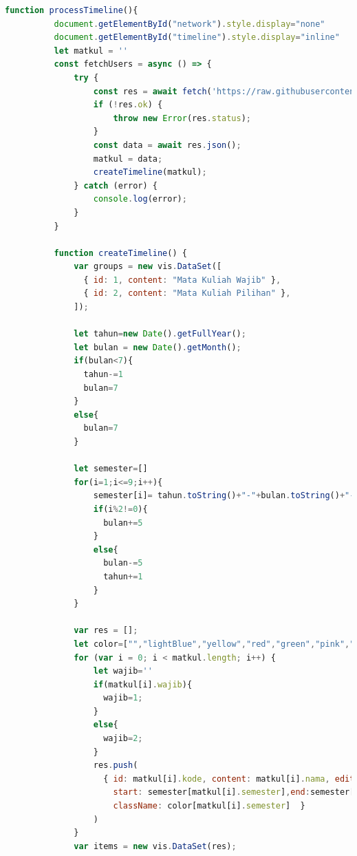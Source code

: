 \begin{itemize}
\begin{itemize}
        \begin{lstlisting}[language=JavaScript, caption=Kode \textit{timeline.js}\label{lst:kodeTimelineJs}]
        function processTimeline(){
          document.getElementById("network").style.display="none"
          document.getElementById("timeline").style.display="inline"
          let matkul = ''
          const fetchUsers = async () => {
              try {
                  const res = await fetch('https://raw.githubusercontent.com/ftisunpar/data/master/prasyarat.json');
                  if (!res.ok) {
                      throw new Error(res.status);
                  }
                  const data = await res.json();
                  matkul = data;
                  createTimeline(matkul);
              } catch (error) {
                  console.log(error);
              }
          }
          
          function createTimeline() {
              var groups = new vis.DataSet([
                { id: 1, content: "Mata Kuliah Wajib" },
                { id: 2, content: "Mata Kuliah Pilihan" },
              ]);
        
              let tahun=new Date().getFullYear();
              let bulan = new Date().getMonth();
              if(bulan<7){
                tahun-=1
                bulan=7
              }
              else{
                bulan=7
              }
        
              let semester=[]
              for(i=1;i<=9;i++){
                  semester[i]= tahun.toString()+"-"+bulan.toString()+"- 31"
                  if(i%2!=0){
                    bulan+=5
                  }
                  else{
                    bulan-=5
                    tahun+=1
                  }
              }
        
              var res = [];
              let color=["","lightBlue","yellow","red","green","pink","purple","orange","darkBlue"]
              for (var i = 0; i < matkul.length; i++) {
                  let wajib=''
                  if(matkul[i].wajib){
                    wajib=1;
                  }
                  else{
                    wajib=2;
                  }
                  res.push(
                    { id: matkul[i].kode, content: matkul[i].nama, editable: false,group:wajib , 
                      start: semester[matkul[i].semester],end:semester[matkul[i].semester+1], 
                      className: color[matkul[i].semester]  }
                  )
              }
              var items = new vis.DataSet(res);


\end{lstlisting}
\end{itemize}
\end{itemize}

